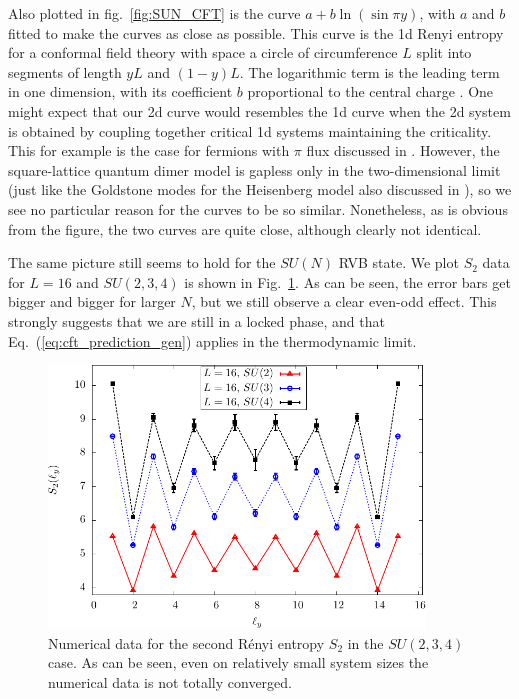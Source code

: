 \documentclass[11pt]{iopart}
\begin{document}
Also plotted in fig.~\ref{fig:SUN_CFT} is the curve $a+b\ln (\sin \pi y)$, with $a$ and $b$ fitted to make the curves as close as possible. This curve is the 1d Renyi entropy for a conformal field theory with space a circle of circumference $L$ split into segments of length $yL$ and $(1-y)L$. The logarithmic term  is the leading term in one dimension, with its coefficient $b$ proportional to the central charge \cite{Cardy}. One might expect that our 2d curve would resembles the 1d curve when the 2d system is obtained by coupling together critical 1d systems maintaining the criticality. This for example is the case for fermions with $\pi$ flux discussed in \cite{Ju2012}. However, the square-lattice quantum dimer model is gapless only in the two-dimensional limit (just like the Goldstone modes for the Heisenberg model also discussed in \cite{Ju2012}), so we see no particular reason for the curves to be so similar. Nonetheless, as is obvious from the figure, the two curves are quite close, although clearly 
not identical. 



The same picture still seems to hold for the $SU(N)$ RVB state. We plot $S_2$ data for $L=16$ and $SU(2,3,4)$ is shown in Fig.~\ref{fig:SUN_shape}. As can be seen, the error bars get bigger and bigger for larger $N$, but we still observe a clear even-odd effect. This strongly suggests that we are still in a locked phase, and that Eq.~(\ref{eq:cft_prediction_gen}) applies in the thermodynamic limit. 
\begin{figure}[ht]
 \begin{center}
  \includegraphics[width=10cm]{./figures/SUN_shape.pdf}
 \end{center}
\caption{Numerical data for the second R\'enyi entropy $S_2$ in the $SU(2,3,4)$ case. As can be seen, even on relatively small system sizes the numerical data is not totally converged. }
\label{fig:SUN_shape}
\end{figure}
\end{document}
